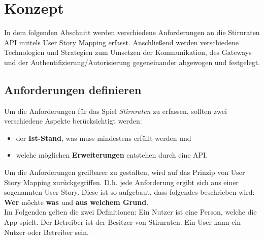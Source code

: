 \section{Konzept}
In dem folgenden Abschnitt werden verschiedene Anforderungen an die Stirnraten API mittels User Story Mapping erfasst. Anschließend werden verschiedene Technologien und Strategien zum Umsetzen der Kommunikation, des Gateways und der Authentifizierung/Autorisierung gegeneinander abgewogen und festgelegt.

\subsection{Anforderungen definieren}
Um die Anforderungen für das Spiel \textit{Stirnraten} zu erfassen, sollten zwei verschiedene Aspekte berücksichtigt werden: 

\begin{itemize}
	\item der \textbf{Ist-Stand}, was muss mindestens erfüllt werden und 
	\item welche möglichen \textbf{Erweiterungen} entstehen durch eine API.
\end{itemize}

Um die Anforderungen greifbarer zu gestalten, wird auf das Prinzip von User Story Mapping zurückgegriffen. D.h. jede Anforderung ergibt sich aus einer sogenannten User Story. Diese ist so aufgebaut, dass folgendes beschrieben wird: \textbf{Wer} möchte \textbf{was} und \textbf{aus welchem Grund}.\cite{UserStoryMapping}\\

Im Folgenden gelten die zwei Definitionen: Ein Nutzer ist eine Person, welche die App spielt. Der Betreiber ist der Besitzer von Stirnraten. Ein User kann ein Nutzer oder Betreiber sein. \\

